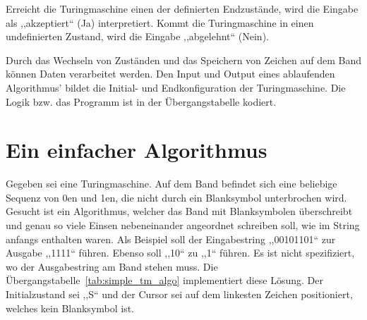 Erreicht die Turingmaschine einen der definierten Endzustände, wird die Eingabe als ,,akzeptiert`` (Ja) interpretiert. Kommt die Turingmaschine in einen undefinierten Zustand, wird die Eingabe ,,abgelehnt`` (Nein).

Durch das Wechseln von Zuständen und das Speichern von Zeichen auf dem Band können Daten verarbeitet werden. Den Input und Output eines ablaufenden Algorithmus' bildet die Initial- und Endkonfiguration der Turingmaschine. Die Logik bzw. das Programm ist in der Übergangstabelle kodiert.

\section{Ein einfacher Algorithmus}
%
Gegeben sei eine Turingmaschine. Auf dem Band befindet sich eine beliebige Sequenz von 0en und 1en, die nicht durch ein Blanksymbol unterbrochen wird. Gesucht ist ein Algorithmus, welcher das Band mit Blanksymbolen überschreibt und genau so viele Einsen nebeneinander angeordnet schreiben soll, wie im String anfangs enthalten waren. Als Beispiel soll der Eingabestring ,,00101101`` zur Ausgabe ,,1111`` führen. Ebenso soll ,,10`` zu ,,1`` führen. Es ist nicht spezifiziert, wo der Ausgabestring am Band stehen muss. Die Übergangstabelle~\ref{tab:simple_tm_algo} implementiert diese Lösung. Der Initialzustand sei ,,S`` und der Cursor sei auf dem linkesten Zeichen positioniert, welches kein Blanksymbol ist.
%
